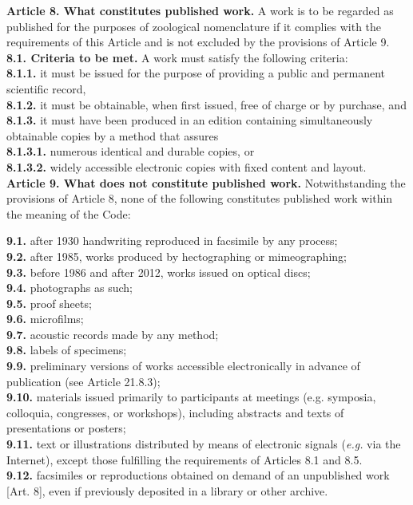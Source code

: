 \documentclass[letterpaper, 11pt]{article}
\begin{document}
\noindent{}\textbf{Article 8. What constitutes published work.} A work is to be regarded as published for the purposes of zoological nomenclature if it complies with the requirements of this Article and is not excluded by the provisions of Article 9.\\
\noindent{}\textbf{8.1. Criteria to be met.} A work must satisfy the following criteria:\\
\noindent{}\textbf{8.1.1.} it must be issued for the purpose of providing a public and permanent scientific record,\\
\noindent{}\textbf{8.1.2.} it must be obtainable, when first issued, free of charge or by purchase, and\\
\noindent{}\textbf{8.1.3.} it must have been produced in an edition containing simultaneously obtainable copies by a method that assures\\
\noindent{}\textbf{8.1.3.1.} numerous identical and durable copies, or\\
\noindent{}\textbf{8.1.3.2.} widely accessible electronic copies with fixed content and layout.\\

\noindent{}\textbf{Article 9. What does not constitute published work.} Notwithstanding the provisions of Article 8, none of the following constitutes published work within the meaning of the Code:

\noindent{}\textbf{9.1.} after 1930 handwriting reproduced in facsimile by any process;\\
\noindent{}\textbf{9.2.} after 1985, works produced by hectographing or mimeographing;\\
\noindent{}\textbf{9.3.} before 1986 and after 2012, works issued on optical discs;\\
\noindent{}\textbf{9.4.} photographs as such;\\
\noindent{}\textbf{9.5.} proof sheets;\\
\noindent{}\textbf{9.6.} microfilms;\\
\noindent{}\textbf{9.7.} acoustic records made by any method;\\
\noindent{}\textbf{9.8.} labels of specimens;\\
\noindent{}\textbf{9.9.} preliminary versions of works accessible electronically in advance of publication (see Article 21.8.3);\\
\noindent{}\textbf{9.10.} materials issued primarily to participants at meetings (e.g. symposia, colloquia, congresses, or workshops), including abstracts and texts of presentations or posters;\\
\noindent{}\textbf{9.11.} text or illustrations distributed by means of electronic signals (\textit{e.g.} via the Internet), except those fulfilling the requirements of Articles 8.1 and 8.5.\\
\noindent{}\textbf{9.12.} facsimiles or reproductions obtained on demand of an unpublished work [Art. 8], even if previously deposited in a library or other archive.\\
\end{document}
